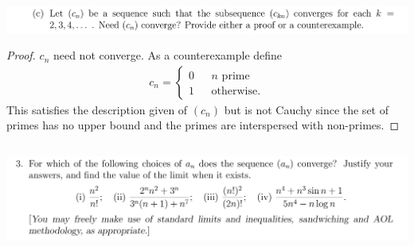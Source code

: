 \documentclass[12pt]{article}
\begin{document}
\begin{mdframed}
\includegraphics[width=400pt]{img/oxford-M2-analysis-I-4-2-c.png}
\end{mdframed}

\begin{proof}
  $c_n$ need not converge. As a counterexample define
  \begin{align*}
    c_n =
    \begin{cases}
      0 ~~~~~~~\text{$n$ prime}\\
      1 ~~~~~~~\text{otherwise}.
    \end{cases}
  \end{align*}
  This satisfies the description given of $(c_n)$ but is not Cauchy since the set of primes has no
  upper bound and the primes are interspersed with non-primes.
\end{proof}

\newpage
\subsection{}
\begin{mdframed}
\includegraphics[width=400pt]{img/oxford-M2-analysis-I-4-3.png}
\end{mdframed}
\end{document}
